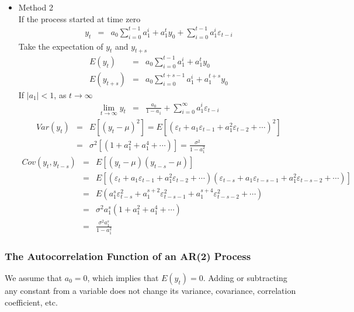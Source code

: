 \begin{itemize}
\item Method 2 \\
If the process started at time zero
\begin{eqnarray*}
y_{t}&=&a_{0}\sum_{i=0}^{t-1}a_{1}^{i}+a_{1}^{t}y_{0}+\sum_{i=0}^{t-1}a_{1}^{i}\varepsilon_{t-i}
\end{eqnarray*}
Take the expectation of $y_{t}$ and $y_{t+s}$
\begin{eqnarray*}
E(y_{t})&=&a_{0}\sum_{i=0}^{t-1}a_{1}^{i}+a_{1}^{t}y_{0}\\
E(y_{t+s})&=&a_{0}\sum_{i=0}^{t+s-1}a_{1}^{i}+a_{1}^{t+s}y_{0}
\end{eqnarray*}
If $|a_{1}|<1$, as $t\rightarrow \infty$
\begin{eqnarray*}
\lim_{t\rightarrow \infty}y_{t}&=&\frac{a_{0}}{1-a_{1}}+\sum_{i=0}^{\infty}a_{1}^{i}\varepsilon_{t-i}
\end{eqnarray*}
\begin{eqnarray*}
Var(y_{t})&=&E\left[ (y_{t}-\mu)^{2}\right]=E\left[ (\varepsilon_{t}+a_{1}\varepsilon_{t-1}+a_{1}^{2}\varepsilon_{t-2}+\cdots)^{2}\right]\\
&=&\sigma^{2}\left[ (1+a_{1}^{2}+a_{1}^{4}+\cdots)\right]=\frac{\sigma^{2}}{1-a_{1}^{2}}
\end{eqnarray*}
\begin{eqnarray*}
Cov(y_{t}, y_{t-s})&=&E\left[ (y_{t}-\mu)(y_{t-s}-\mu)\right]\\
&=&E\left[ (\varepsilon_{t}+a_{1}\varepsilon_{t-1}+a_{1}^{2}\varepsilon_{t-2}+\cdots)(\varepsilon_{t-s}+a_{1}\varepsilon_{t-s-1}+a_{1}^{2}\varepsilon_{t-s-2}+\cdots)\right]\\
&=&E\left( a_{1}^{s}\varepsilon_{t-s}^{2}+a_{1}^{s+2}\varepsilon_{t-s-1}^{2}+a_{1}^{s+4}\varepsilon_{t-s-2}^{2}+\cdots\right)\\
&=&\sigma^{2}a_{1}^{s}(1+a_{1}^{2}+a_{1}^{4}+\cdots)\\
&=&\frac{\sigma^{2}a_{1}^{s}}{1-a_{1}^{2}}
\end{eqnarray*}
\end{itemize}

\subsubsection{The Autocorrelation Function of an AR(2) Process}
We assume that $a_{0}=0$, which implies that $E(y_{t})=0$. Adding or subtracting any constant from a variable does not change its variance, covariance, correlation coefficient, etc.

